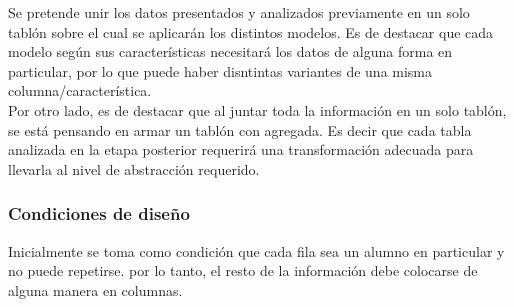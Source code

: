 Se pretende unir los datos presentados y analizados previamente en un solo tablón sobre el cual se aplicarán los distintos modelos. Es de destacar que cada modelo según sus características necesitará los datos de alguna forma en particular, por lo que puede haber disntintas variantes de una misma columna/característica. \\
Por otro lado, es de destacar que al juntar toda la información en un solo tablón, se está pensando en armar un tablón con agregada. Es decir que cada tabla analizada en la etapa posterior requerirá una transformación adecuada para llevarla al nivel de abstracción requerido.\\
\subsubsection{Condiciones de diseño}
Inicialmente se toma como condición que cada fila sea un alumno en particular y no puede repetirse. por lo tanto, el resto de la información debe colocarse de alguna manera en columnas.